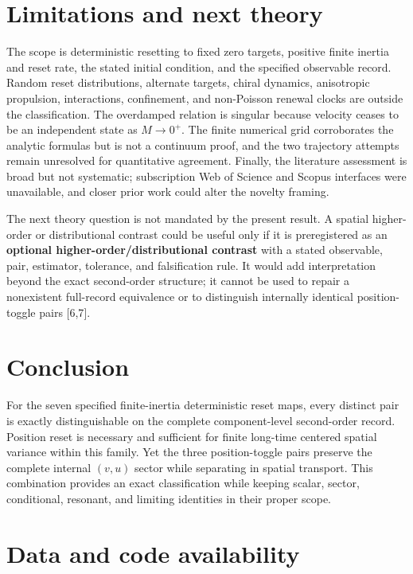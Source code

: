 \section{Limitations and next theory}\label{limitations-and-next-theory}

The scope is deterministic resetting to fixed zero targets, positive finite inertia and reset rate, the stated initial condition, and the specified observable record. Random reset distributions, alternate targets, chiral dynamics, anisotropic propulsion, interactions, confinement, and non-Poisson renewal clocks are outside the classification. The overdamped relation is singular because velocity ceases to be an independent state as \(M\to0^+\). The finite numerical grid corroborates the analytic formulas but is not a continuum proof, and the two trajectory attempts remain unresolved for quantitative agreement. Finally, the literature assessment is broad but not systematic; subscription Web of Science and Scopus interfaces were unavailable, and closer prior work could alter the novelty framing.

The next theory question is not mandated by the present result. A spatial higher-order or distributional contrast could be useful only if it is preregistered as an \textbf{optional higher-order/distributional contrast} with a stated observable, pair, estimator, tolerance, and falsification rule. It would add interpretation beyond the exact second-order structure; it cannot be used to repair a nonexistent full-record equivalence or to distinguish internally identical position-toggle pairs {[}6,7{]}.

\section{Conclusion}\label{conclusion}

For the seven specified finite-inertia deterministic reset maps, every distinct pair is exactly distinguishable on the complete component-level second-order record. Position reset is necessary and sufficient for finite long-time centered spatial variance within this family. Yet the three position-toggle pairs preserve the complete internal \((v,u)\) sector while separating in spatial transport. This combination provides an exact classification while keeping scalar, sector, conditional, resonant, and limiting identities in their proper scope.

\section{Data and code availability}\label{data-and-code-availability}

